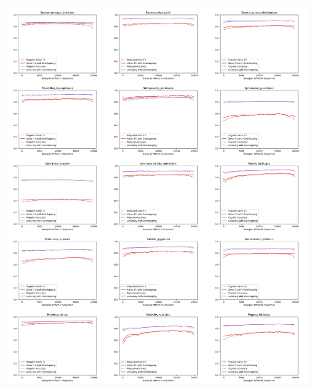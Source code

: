 \documentclass{article}
\begin{document}
\begin{figure}[!h]
\centerline{\includegraphics[width=\overlapscale\textwidth]{images/overlapping/montage_animals9}}
\end{figure}
\end{document}
